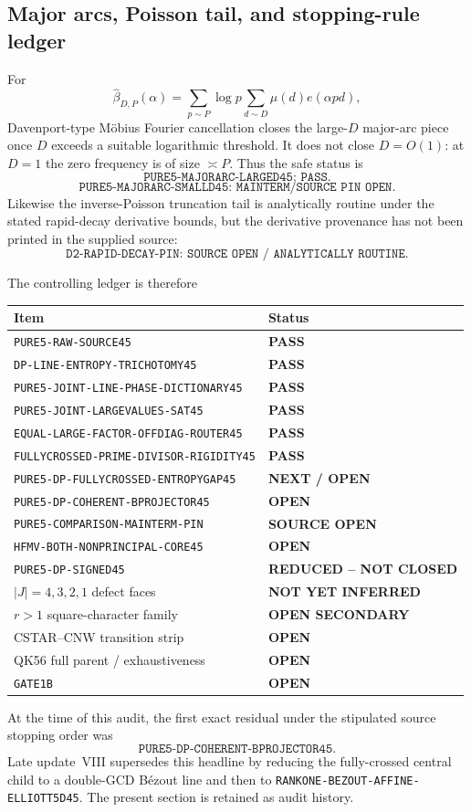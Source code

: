 \documentclass[11pt]{article}
\theoremstyle{definition}
\newcommand{\1}{\mathbf 1}
\begin{document}
\subsection{Major arcs, Poisson tail, and stopping-rule ledger}
For
\[
 \widehat\beta_{D,P}(\alpha)
 =\sum_{p\sim P}\log p\sum_{d\sim D}\mu(d)e(\alpha pd),
\]
Davenport-type M\"obius Fourier cancellation closes the large-$D$ major-arc
piece once $D$ exceeds a suitable logarithmic threshold.  It does not close
$D=O(1)$: at $D=1$ the zero frequency is of size $\asymp P$.  Thus the safe
status is
\[
 \boxed{\texttt{PURE5-MAJORARC-LARGED45: PASS}}.
\]
\[
 \boxed{\texttt{PURE5-MAJORARC-SMALLD45: MAINTERM/SOURCE PIN OPEN}}.
\]
Likewise the inverse-Poisson truncation tail is analytically routine under the
stated rapid-decay derivative bounds, but the derivative provenance has not
been printed in the supplied source:
\[
 \boxed{\texttt{D2-RAPID-DECAY-PIN: SOURCE OPEN / ANALYTICALLY ROUTINE}}.
\]

The controlling ledger is therefore
\begin{center}
\small
\begin{tabular}{p{}p{}}
\toprule
Item & Status\\
\midrule
\texttt{PURE5-RAW-SOURCE45} & \textbf{PASS}\\
\texttt{DP-LINE-ENTROPY-TRICHOTOMY45} & \textbf{PASS}\\
\texttt{PURE5-JOINT-LINE-PHASE-DICTIONARY45} & \textbf{PASS}\\
\texttt{PURE5-JOINT-LARGEVALUES-SAT45} & \textbf{PASS}\\
\texttt{EQUAL-LARGE-FACTOR-OFFDIAG-ROUTER45} & \textbf{PASS}\\
\texttt{FULLYCROSSED-PRIME-DIVISOR-RIGIDITY45} & \textbf{PASS}\\
\texttt{PURE5-DP-FULLYCROSSED-ENTROPYGAP45} & \textbf{NEXT / OPEN}\\
\texttt{PURE5-DP-COHERENT-BPROJECTOR45} & \textbf{OPEN}\\
\texttt{PURE5-COMPARISON-MAINTERM-PIN} & \textbf{SOURCE OPEN}\\
\texttt{HFMV-BOTH-NONPRINCIPAL-CORE45} & \textbf{OPEN}\\
\texttt{PURE5-DP-SIGNED45} & \textbf{REDUCED -- NOT CLOSED}\\
$|J|=4,3,2,1$ defect faces & \textbf{NOT YET INFERRED}\\
$r>1$ square-character family & \textbf{OPEN SECONDARY}\\
CSTAR--CNW transition strip & \textbf{OPEN}\\
QK56 full parent / exhaustiveness & \textbf{OPEN}\\
\texttt{GATE1B} & \textbf{OPEN}\\
\bottomrule
\end{tabular}
\end{center}
At the time of this audit, the first exact residual under the stipulated
source stopping order was
\[
 \boxed{\texttt{PURE5-DP-COHERENT-BPROJECTOR45}.}
\]
Late update~VIII supersedes this headline by reducing the fully-crossed
central child to a double-GCD B\'ezout line and then to
\texttt{RANKONE-BEZOUT-AFFINE-ELLIOTT5D45}.  The present section is retained
as audit history.
\end{document}
